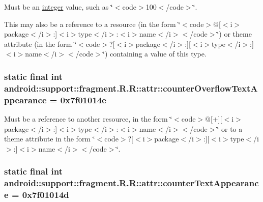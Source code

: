 Must be an \hyperlink{classandroid_1_1support_1_1fragment_1_1_r_1_1integer}{integer} value, such as \char`\"{}$<$code$>$100$<$/code$>$\char`\"{}. 

This may also be a reference to a resource (in the form \char`\"{}$<$code$>$@\mbox{[}$<$i$>$package$<$/i$>$:\mbox{]}$<$i$>$type$<$/i$>$:$<$i$>$name$<$/i$>$$<$/code$>$\char`\"{}) or theme attribute (in the form \char`\"{}$<$code$>$?\mbox{[}$<$i$>$package$<$/i$>$:\mbox{]}\mbox{[}$<$i$>$type$<$/i$>$:\mbox{]}$<$i$>$name$<$/i$>$$<$/code$>$\char`\"{}) containing a value of this type. \hypertarget{classandroid_1_1support_1_1fragment_1_1_r_1_1attr_f7013095ac8f53db39003d4ad7ee8de4}{
\subsubsection[{counterOverflowTextAppearance}]{\setlength{\rightskip}{0pt plus 5cm}static final int android::support::fragment.R.R::attr::counterOverflowTextAppearance = 0x7f01014e}}
\label{classandroid_1_1support_1_1fragment_1_1_r_1_1attr_f7013095ac8f53db39003d4ad7ee8de4}


Must be a reference to another resource, in the form \char`\"{}$<$code$>$@\mbox{[}+\mbox{]}\mbox{[}$<$i$>$package$<$/i$>$:\mbox{]}$<$i$>$type$<$/i$>$:$<$i$>$name$<$/i$>$$<$/code$>$\char`\"{} or to a theme attribute in the form \char`\"{}$<$code$>$?\mbox{[}$<$i$>$package$<$/i$>$:\mbox{]}\mbox{[}$<$i$>$type$<$/i$>$:\mbox{]}$<$i$>$name$<$/i$>$$<$/code$>$\char`\"{}. \hypertarget{classandroid_1_1support_1_1fragment_1_1_r_1_1attr_5686b9017d6ba34c1ced1532d9ddb193}{
\subsubsection[{counterTextAppearance}]{\setlength{\rightskip}{0pt plus 5cm}static final int android::support::fragment.R.R::attr::counterTextAppearance = 0x7f01014d}}
\label{classandroid_1_1support_1_1fragment_1_1_r_1_1attr_5686b9017d6ba34c1ced1532d9ddb193}


